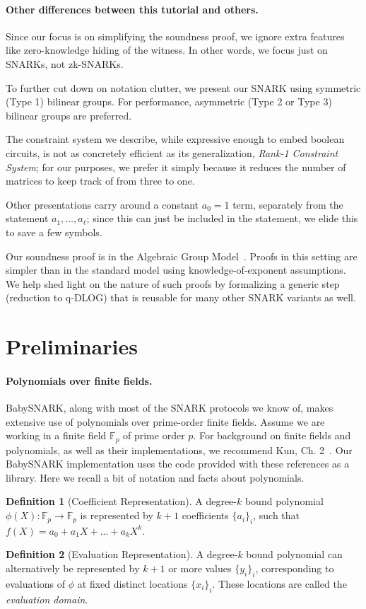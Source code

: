 \documentclass{article}
\theoremstyle{definition}
\newtheorem{definition}{Definition}[section]
\theoremstyle{remark}
\newcommand{\F}{\mathbb{F}}
\begin{document}
\paragraph{Other differences between this tutorial and others.} 
Since our focus is on simplifying the soundness proof, we ignore extra features like zero-knowledge hiding of the witness. In other words, we focus just on SNARKs, not zk-SNARKs.

To further cut down on notation clutter, we present our SNARK using symmetric (Type 1) bilinear groups. For performance, asymmetric (Type 2 or Type 3) bilinear groups are preferred.

The constraint system we describe, while expressive enough to embed boolean circuits, is not as concretely efficient as its generalization, \emph{Rank-1 Constraint System}; for our purposes, we prefer it simply because it reduces the number of matrices to keep track of from three to one.

Other presentations carry around a constant $a_0=1$ term, separately from the statement $a_1,\dots,a_\ell$; since this can just be included in the statement, we elide this to save a few symbols.

Our soundness proof is in the Algebraic Group Model~\cite{fuchsbauer2018algebraic}. Proofs in this setting are simpler than in the standard model using knowledge-of-exponent assumptions. We help shed light on the nature of such proofs by formalizing a generic step (reduction to q-DLOG) that is reusable for many other SNARK variants as well.

\section{Preliminaries}

\paragraph{Polynomials over finite fields.}
BabySNARK, along with most of the SNARK protocols we know of, makes extensive use of polynomials over prime-order finite fields.
Assume we are working in a finite field $\F_p$ of prime order $p$.
For background on finite fields and polynomials, as well as their implementations, we recommend Kun, Ch. 2~\cite{pim,primer}. Our BabySNARK implementation uses the code provided with these references as a library.
Here we recall a bit of notation and facts about polynomials.


\theoremstyle{definition}
\begin{definition}[Coefficient Representation]
A degree-$k$ bound polynomial $\phi(X) : \F_p \rightarrow \F_p$ is represented by $k+1$ coefficients $\{a_i\}_i$, such that $f(X) = a_0 + a_1X + ... + a_k X^k$.
\end{definition}
\begin{definition}[Evaluation Representation]
A degree-$k$ bound polynomial can alternatively be represented by $k+1$ or more values $\{y_i\}_i$, corresponding to evaluations of $\phi$ at fixed distinct locations $\{x_i\}_i$. These locations are called the \emph{evaluation domain}.
\end{definition}
\end{document}
